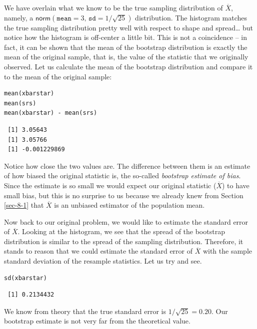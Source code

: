 \documentclass[captions=tableheading]{scrbook}
\begin{document}
\begin{example}
We have overlain what we know to be the true sampling distribution of \(\overline{X}\), namely, a \(\mathsf{norm}(\mathtt{mean}=3,\,\mathtt{sd}=1/\sqrt{25})\) distribution. The histogram matches the true sampling distribution pretty well with respect to shape and spread\ldots{} but notice how the histogram is off-center a little bit. This is not a coincidence -- in fact, it can be shown that the mean of the bootstrap distribution is exactly the mean of the original sample, that is, the value of the statistic that we originally observed. Let us calculate the mean of the bootstrap distribution and compare it to the mean of the original sample:


\begin{verbatim}
mean(xbarstar)
mean(srs)
mean(xbarstar) - mean(srs)
\end{verbatim}

\begin{verbatim}
 [1] 3.05643
 [1] 3.05766
 [1] -0.001229869
\end{verbatim}

\end{example}

Notice how close the two values are. The difference between them is an estimate of how biased the original statistic is, the so-called \emph{bootstrap estimate of bias}. Since the estimate is so small we would expect our original statistic (\(\overline{X}\)) to have small bias, but this is no surprise to us because we already knew from Section \ref{sec-8-1} that \(\overline{X}\) is an unbiased estimator of the population mean.

Now back to our original problem, we would like to estimate the standard error of \(\overline{X}\). Looking at the histogram, we see that the spread of the bootstrap distribution is similar to the spread of the sampling distribution. Therefore, it stands to reason that we could estimate the standard error of \(\overline{X}\) with the sample standard deviation of the resample statistics. Let us try and see.


\begin{verbatim}
sd(xbarstar)
\end{verbatim}

\begin{verbatim}
 [1] 0.2134432
\end{verbatim}

We know from theory that the true standard error is \(1/\sqrt{25}=0.20\). Our bootstrap estimate is not very far from the theoretical value. 
\end{document}

